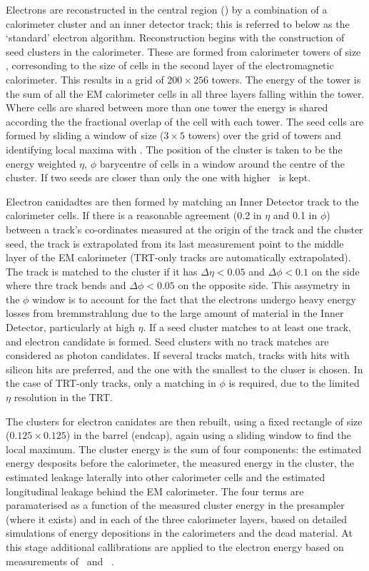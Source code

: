 Electrons are reconstructed in the central region () by a
combination of a calorimeter cluster and an inner detector track; this is
referred to below as the `standard' electron algorithm. Reconstruction begins
with the construction of seed clusters in the calorimeter. These are formed from
calorimeter towers of size , corresonding to the
size of cells in the second layer of the electromagnetic calorimeter. This
results in a grid of $200 \times 256$ towers. The energy
of the tower is the sum of all the EM calorimeter cells in all three layers
falling within the tower. Where cells are shared between more than one tower the
energy is shared according the the fractional overlap of the cell with each
tower. The seed cells are formed by sliding a
window of size  ($3 \times 5$ towers) over the
grid of towers and identifying local maxima with  \gev. The position
of the cluster is taken to be the energy weighted $\eta$, $\phi$ barycentre of
cells in a window around the centre of the cluster. If two seeds are closer than
 only the one with higher \et\ is kept.

Electron canidadtes are then formed by matching an Inner Detector track to the
calorimeter cells. If there is a reasonable agreement (0.2 in $\eta$ and 0.1 in
$\phi$) between a track's co-ordinates measured at the origin of the track and
the cluster seed, the track is extrapolated from its last measurement point to
the middle layer of the EM calorimeter (TRT-only tracks are automatically
extrapolated). The track is matched to the cluster if it has $\Delta \eta <
0.05$ and $\Delta \phi < 0.1$ on the side where thre track bends and  $\Delta
\phi < 0.05$ on the opposite side. This assymetry in the $\phi$ window is to
account for the fact that the electrons undergo heavy energy losses from
bremmstrahlung due to the large amount of material in the Inner Detector,
particularly at high $\eta$. If a seed cluster matches to at least one track,
and electron candidate is formed. Seed clusters with no track matches are
considered as photon candidates. If several tracks match, tracks with hits with
silicon hits are preferred, and the one with the smallest \deltaR to the cluser
is chosen. In the case of TRT-only tracks, only a matching in $\phi$ is required, 
due to the limited $\eta$ resolution in the TRT.

The clusters for electron canidates are then rebuilt, using a fixed rectangle of size 
 ($0.125 \times 0.125$) in the barrel (endcap),
again using a sliding window to find the local maximum. The cluster energy is
the sum of four components: the estimated energy desposits before the
calorimeter, the measured energy in the cluster, the estimated leakage laterally
into other calorimeter cells and the estimated longitudinal leakage behind the
EM calorimeter. The four terms are paramaterised as a function of the measured
cluster energy in the presampler (where it exists) and in each of the three
calorimeter layers, based on detailed simulations of energy depositions in the
calorimeters and the dead material. At this stage additional callibrations are
applied to the electron energy based on measurements of \Zee\ and
\JPsiee~\cite{Aad:2011mk}.


